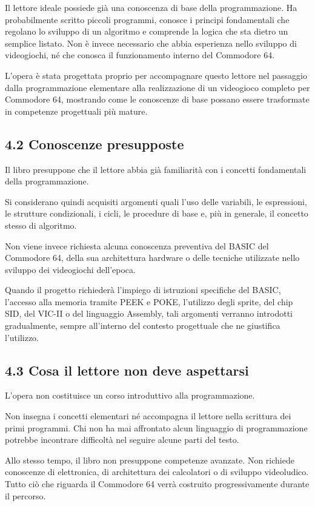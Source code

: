 \documentclass{article}
\begin{document}
Il lettore ideale possiede già una conoscenza di base della programmazione. Ha probabilmente scritto piccoli programmi,
conosce i principi fondamentali che regolano lo sviluppo di un algoritmo e comprende la logica che sta dietro un
semplice listato. Non è invece necessario che abbia esperienza nello sviluppo di videogiochi, né che conosca il
funzionamento interno del Commodore 64.

L'opera è stata progettata proprio per accompagnare questo lettore nel passaggio dalla programmazione elementare alla
realizzazione di un videogioco completo per Commodore 64, mostrando come le conoscenze di base possano essere
trasformate in competenze progettuali più mature.

\subsection{4.2 Conoscenze presupposte}
Il libro presuppone che il lettore abbia già familiarità con i concetti fondamentali della programmazione.

Si considerano quindi acquisiti argomenti quali l'uso delle variabili, le espressioni, le strutture condizionali, i
cicli, le procedure di base e, più in generale, il concetto stesso di algoritmo.

Non viene invece richiesta alcuna conoscenza preventiva del BASIC del Commodore 64, della sua architettura hardware o
delle tecniche utilizzate nello sviluppo dei videogiochi dell'epoca.

Quando il progetto richiederà l'impiego di istruzioni specifiche del BASIC, l'accesso alla memoria tramite PEEK e POKE,
l'utilizzo degli sprite, del chip SID, del VIC-II o del linguaggio Assembly, tali argomenti verranno introdotti
gradualmente, sempre all'interno del contesto progettuale che ne giustifica l'utilizzo.

\subsection{4.3 Cosa il lettore non deve aspettarsi}
L'opera non costituisce un corso introduttivo alla programmazione.

Non insegna i concetti elementari né accompagna il lettore nella scrittura dei primi programmi. Chi non ha mai
affrontato alcun linguaggio di programmazione potrebbe incontrare difficoltà nel seguire alcune parti del testo.

Allo stesso tempo, il libro non presuppone competenze avanzate. Non richiede conoscenze di elettronica, di architettura
dei calcolatori o di sviluppo videoludico. Tutto ciò che riguarda il Commodore 64 verrà costruito progressivamente
durante il percorso.
\end{document}
